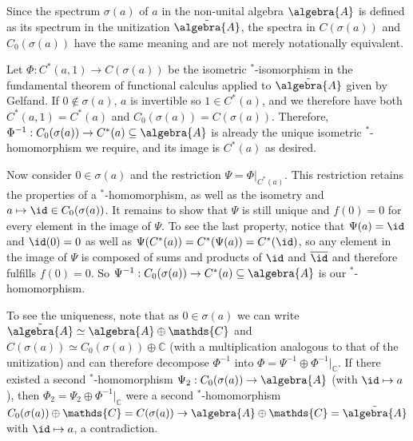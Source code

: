 \documentclass[a4paper]{article}
\begin{document}
\subsection{}

Since the spectrum $\sigma(a)$ of $a$ in the non-unital algebra $\algebra{A}$ is defined as its spectrum in the unitization $\tilde{\algebra{A}}$, the spectra in $C(\sigma(a))$ and $C_0(\sigma(a))$ have the same meaning and are not merely notationally equivalent.

Let $\Phi: C^*(a,1) \to C(\sigma(a))$ be the isometric $^*$-isomorphism in the fundamental theorem of functional calculus applied to $\tilde{\algebra{A}}$ given by Gelfand.
If $0 \notin \sigma(a)$, $a$ is invertible so $1 \in C^*(a)$, and we therefore have both $C^*(a,1) = C^*(a)$ and $C_0(\sigma(a)) = C(\sigma(a))$.
Therefore, $\Phi^{-1}: C_0(\sigma(a)) \to C^*(a) \subseteq \algebra{A}$ is already the unique isometric $^*$-homomorphism we require, and its image is $C^*(a)$ as desired.

Now consider $0 \in \sigma(a)$ and the restriction $\Psi = \Phi|_{C^*(a)}$.
This restriction retains the properties of a $^*$-homomorphism, as well as the isometry and $a \mapsto \id \in C_0(\sigma(a))$.
It remains to show that $\Psi$ is still unique and $f(0) = 0$ for every element in the image of $\Psi$.
To see the last property, notice that $\Psi(a) = \id$ and $\id(0) = 0$ as well as $\Psi(C^*(a)) = C^*(\Psi(a)) = C^*(\id)$, so any element in the image of $\Psi$ is composed of sums and products of $\id$ and $\overline{\id}$ and therefore fulfills $f(0) = 0$.
So $\Psi^{-1}: C_0(\sigma(a)) \to C^*(a) \subseteq \algebra{A}$ is our $^*$-homomorphism.

To see the uniqueness, note that as $0 \in \sigma(a)$ we can write $\tilde{\algebra{A}} \simeq \algebra{A} \oplus \mathds{C}$ and $C(\sigma(a)) \simeq C_0(\sigma(a)) \oplus \mathds{C}$ (with a multiplication analogous to that of the unitization) and can therefore decompose $\Phi^{-1}$ into $\Phi = \Psi^{-1} \oplus \Phi^{-1}|_\mathds{C}$.
If there existed a second $^*$-homomorphism $\Psi_2: C_0(\sigma(a)) \to \algebra{A}$ (with $\id \mapsto a$), then $\Phi_2 = \Psi_2 \oplus \Phi^{-1}|_\mathds{C}$ were a second $^*$-homomorphism $C_0(\sigma(a)) \oplus \mathds{C} = C(\sigma(a)) \to \algebra{A} \oplus \mathds{C} = \tilde{\algebra{A}}$ with $\id \mapsto a$, a contradiction.
\end{document}

